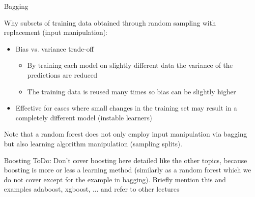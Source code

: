 \documentclass[11pt,compress,t,notes=noshow, aspectratio=169, xcolor=table]{beamer}
\begin{document}
\begin{vbframe}{Bagging}

Why subsets of training data obtained through random sampling with replacement (input manipulation):
\begin{itemize}
    \item Bias vs. variance trade-off
    \begin{itemize}
        \item By training each model on slightly different data the variance of the predictions are reduced
        \item The training data is reused many times so bias can be slightly higher  
    \end{itemize}
    \item Effective for cases where small changes in the training set may result in a completely different model (instable learners)
\end{itemize}
\vspace{1em}
Note that a random forest does not only employ input manipulation via bagging but also learning algorithm manipulation (sampling splits).

\end{vbframe}


\begin{vbframe}{Boosting}
ToDo: Don't cover boosting here detailed like the other topics, because boosting is more or less a learning method (similarly as a random forest which we do not cover except for the example in bagging).
Briefly mention this and examples adaboost, xgboost, ... and refer to other lectures


\end{vbframe}
\end{document}
